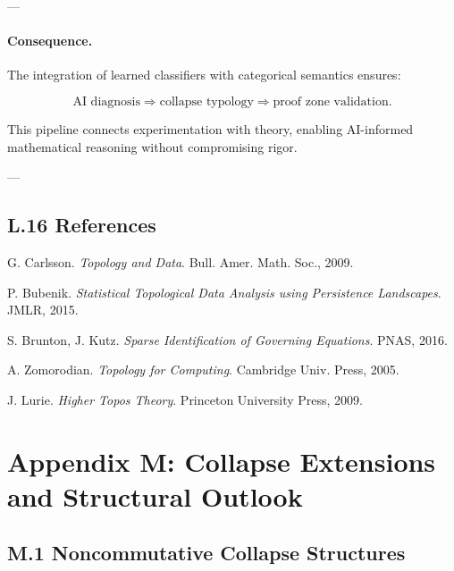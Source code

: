 \documentclass[11pt]{article}
\begin{document}
\begin{axiom}
\begin{axiom}
{{---

\paragraph{Consequence.}

The integration of learned classifiers with categorical semantics ensures:

\[
\text{AI diagnosis} \Rightarrow \text{collapse typology} \Rightarrow \text{proof zone validation}.
\]

This pipeline connects experimentation with theory, enabling AI-informed mathematical reasoning  
without compromising rigor.

---

\subsection*{L.16 References}

\begin{thebibliography}{9}

G. Carlsson.  
\textit{Topology and Data}. Bull. Amer. Math. Soc., 2009.

P. Bubenik.  
\textit{Statistical Topological Data Analysis using Persistence Landscapes}. JMLR, 2015.

S. Brunton, J. Kutz.  
\textit{Sparse Identification of Governing Equations}. PNAS, 2016.

A. Zomorodian.  
\textit{Topology for Computing}. Cambridge Univ. Press, 2005.

J. Lurie.  
\textit{Higher Topos Theory}. Princeton University Press, 2009.

\end{thebibliography}




\section*{Appendix M: Collapse Extensions and Structural Outlook}

\subsection*{M.1 Noncommutative Collapse Structures}

}}
\end{axiom}
\end{axiom}
\end{document}
